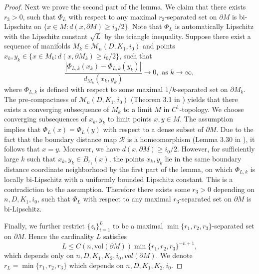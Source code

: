 \documentclass[11pt,letterpaper]{amsart}
\numberwithin{equation}{section}
\theoremstyle{definition}
\theoremstyle{plain}
\theoremstyle{definition}
\theoremstyle{plain}
\theoremstyle{definition}
\theoremstyle{plain}
\newcommand{\vol}{\textrm{vol}}
\begin{document}
\begin{proof}
\smallskip
Next we prove the second part of the lemma. We claim that there exists $r_3>0$, such that $\Phi_L$ with respect to any maximal $r_3$-separated set on $\partial M$ is bi-Lipschitz on $\{x\in M: d(x,\partial M)\geqslant i_0/2\}$. Note that $\Phi_L$ is automatically Lipschitz with the Lipschitz constant $\sqrt{L}$ by the triangle inequality. Suppose there exist a sequence of manifolds $M_k\in \mathcal{M}_n(D,K_1,i_0)$ and points $x_k,y_k\in \{x\in M_k: d(x,\partial M_k)\geqslant i_0/2\}$, such that 
$$\frac{|\Phi_{L,k}(x_k)-\Phi_{L,k}(y_k)|}{d_{M_k}(x_k,y_k)}\to 0,\textrm{ as }k\to \infty,$$ 
where $\Phi_{L,k}$ is defined with respect to some maximal $1/k$-separated set on $\partial M_k$. The pre-compactness of $\mathcal{M}_n(D,K_1,i_0)$ (Theorem 3.1 in \cite{AKKLT}) yields that there exists a converging subsequence of $M_k$ to a limit $M$ in $C^1$-topology. 
We choose converging subsequences of $x_k,y_k$ to limit points $x,y\in M$. The assumption implies that $\Phi_{L}(x)=\Phi_{L}(y)$ with respect to a dense subset of $\partial M$. Due to the fact that the boundary distance map $\mathcal{R}$ is a homeomorphism (Lemma 3.30 in \cite{KKL}), it follows that $x=y$. Moreover, we have $d(x,\partial M)\geqslant i_0/2$. However, for sufficiently large $k$ such that $x_k,y_k\in B_{r_1}(x)$, the points $x_k,y_k$ lie in the same boundary distance coordinate neighborhood by the first part of the lemma, on which $\Phi_{L,k}$ is locally bi-Lipschitz with a uniformly bounded Lipschitz constant. This is a contradiction to the assumption. Therefore there exists some $r_3>0$ depending on $n,D,K_1,i_0$, such that $\Phi_L$ with respect to any maximal $r_3$-separated set on $\partial M$ is bi-Lipschitz.

Finally, we further restrict $\{z_i\}_{i=1}^L$ to be a maximal $\min\{r_1,r_2,r_3\}$-separated set on $\partial M$. Hence the cardinality $L$ satisfies
$$L\leqslant C(n,\vol(\partial M))\min\{r_1,r_2,r_3\}^{-n+1},$$ 
which depends only on $n,D,K_1,K_2,i_0,vol(\partial M)$. We denote $r_L=\min\{r_1,r_2,r_3\}$ which depends on $n,D,K_1,K_2,i_0$.
\end{proof}
\end{document}
